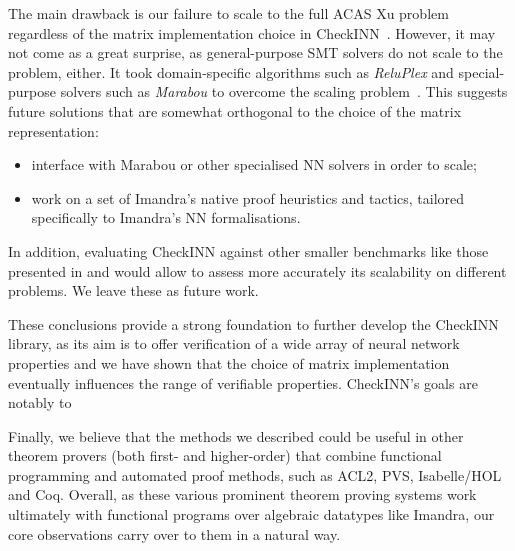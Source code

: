 \documentclass[runningheads]{llncs}
\begin{document}
The main drawback is our failure to scale to the full ACAS Xu problem regardless of the matrix implementation choice in CheckINN~\cite{DPKD22}. However, it may not come as a great surprise, as general-purpose SMT solvers do not scale to the problem, either.  It took  domain-specific algorithms such as \emph{ReluPlex} and special-purpose solvers such as \emph{Marabou}  to overcome the scaling problem~\cite{KaBaDiJuKo17Reluplex,KatzHIJLLSTWZDK19}.
This suggests future solutions that are somewhat orthogonal to the choice of the matrix representation:
\begin{itemize}
  \item interface with Marabou or other specialised NN solvers in order to scale;
\item work on a set of Imandra's native proof heuristics and tactics, tailored specifically to Imandra's NN formalisations.
\end{itemize}

In addition, evaluating CheckINN against other smaller benchmarks like those presented in \cite{noauthor_vnn_nodate} and \cite{dutta_output_2018} would allow to assess more accurately its scalability on different problems. We leave these as future work. 

These conclusions provide a strong foundation to further develop the CheckINN library, as its aim is to offer verification of a wide array of neural network properties and we have shown that the choice of matrix implementation eventually influences the range of verifiable properties. CheckINN's goals are notably to 

Finally, we believe that the methods we described could be useful in other theorem provers (both first- and higher-order) that combine functional programming and automated proof methods, such as ACL2, PVS, Isabelle/HOL and Coq. 
Overall, as these various prominent theorem proving systems work ultimately with functional programs over algebraic datatypes like Imandra, our core observations carry over to them in a natural way.
\end{document}
